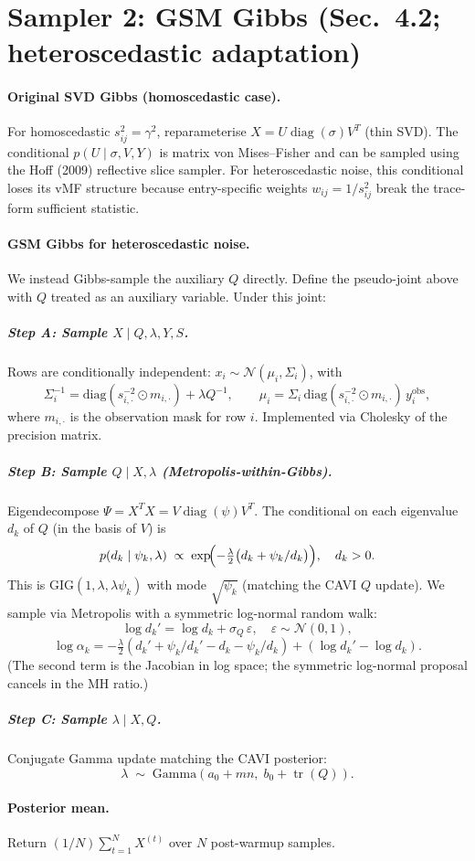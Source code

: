 \section*{Sampler 2: GSM Gibbs (Sec.\ 4.2; heteroscedastic adaptation)}

\paragraph{Original SVD Gibbs (homoscedastic case).}
For homoscedastic $s_{ij}^2=\gamma^2$, reparameterise $X=U\operatorname{diag}(\sigma)V^T$
(thin SVD).  The conditional $p(U\mid\sigma,V,Y)$ is matrix von Mises--Fisher
and can be sampled using the Hoff (2009) reflective slice sampler.  For
heteroscedastic noise, this conditional loses its vMF structure because
entry-specific weights $w_{ij}=1/s_{ij}^2$ break the trace-form sufficient
statistic.

\paragraph{GSM Gibbs for heteroscedastic noise.}
We instead Gibbs-sample the auxiliary $Q$ directly.  Define the pseudo-joint
above with $Q$ treated as an auxiliary variable.  Under this joint:

\subparagraph{Step A: Sample $X\mid Q,\lambda,Y,S$.}
Rows are conditionally independent:
$x_i \sim \mathcal{N}(\mu_i,\Sigma_i)$, with
\[
  \Sigma_i^{-1} = \mathrm{diag}(s_{i,\cdot}^{-2}\odot m_{i,\cdot}) + \lambda Q^{-1},
  \qquad
  \mu_i = \Sigma_i\,\mathrm{diag}(s_{i,\cdot}^{-2}\odot m_{i,\cdot})\,y_i^{\text{obs}},
\]
where $m_{i,\cdot}$ is the observation mask for row $i$.
Implemented via Cholesky of the precision matrix.

\subparagraph{Step B: Sample $Q\mid X,\lambda$ (Metropolis-within-Gibbs).}
Eigendecompose $\Psi=X^TX=V\operatorname{diag}(\psi)V^T$.
The conditional on each eigenvalue $d_k$ of $Q$ (in the basis of $V$) is
\[
  p(d_k\mid\psi_k,\lambda)
  \;\propto\; \exp\!\Bigl(-\tfrac{\lambda}{2}\bigl(d_k + \psi_k/d_k\bigr)\Bigr),
  \quad d_k>0.
\]
This is GIG$(1,\lambda,\lambda\psi_k)$ with mode $\sqrt{\psi_k}$ (matching
the CAVI $Q$ update).  We sample via Metropolis with a symmetric log-normal
random walk:
\[
  \log d_k' = \log d_k + \sigma_Q\,\varepsilon,\quad \varepsilon\sim\mathcal{N}(0,1),
\]
\[
  \log\alpha_k
  = -\tfrac{\lambda}{2}(d_k'+\psi_k/d_k'-d_k-\psi_k/d_k)
  + (\log d_k' - \log d_k).
\]
(The second term is the Jacobian in log space; the symmetric log-normal
proposal cancels in the MH ratio.)

\subparagraph{Step C: Sample $\lambda\mid X,Q$.}
Conjugate Gamma update matching the CAVI posterior:
\[
  \lambda \;\sim\; \mathrm{Gamma}(a_0+mn,\; b_0+\operatorname{tr}(Q)).
\]

\paragraph{Posterior mean.}
Return $(1/N)\sum_{t=1}^N X^{(t)}$ over $N$ post-warmup samples.

